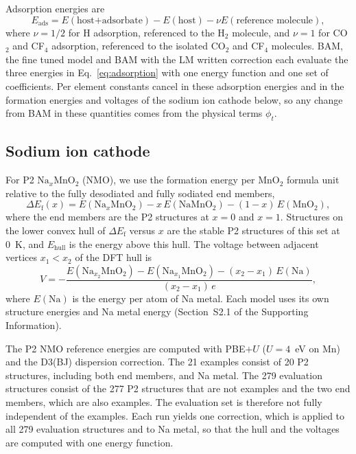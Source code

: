 Adsorption energies are
\begin{equation}
E_{\mathrm{ads}}=E(\text{host+adsorbate})-E(\text{host})-\nu E(\text{reference molecule}),
\label{eq:adsorption}
\end{equation}
where $\nu=1/2$ for H adsorption, referenced to the H$_2$ molecule, and $\nu=1$ for CO$_2$ and CF$_4$ adsorption, referenced to the isolated CO$_2$ and CF$_4$ molecules. BAM, the fine tuned model and BAM with the LM written correction each evaluate the three energies in Eq.~\eqref{eq:adsorption} with one energy function and one set of coefficients. Per element constants cancel in these adsorption energies and in the formation energies and voltages of the sodium ion cathode below, so any change from BAM in these quantities comes from the physical terms $\phi_t$.

\subsection{Sodium ion cathode}
\label{sec:hull-methods}

For P2 $\mathrm{Na}_x\mathrm{MnO_2}$ (NMO), we use the formation energy per MnO$_2$ formula unit relative to the fully desodiated and fully sodiated end members,
\begin{equation}
\Delta E_\mathrm{f}(x)=E(\mathrm{Na}_x\mathrm{MnO_2})-x\,E(\mathrm{NaMnO_2})-(1-x)\,E(\mathrm{MnO_2}),
\label{eq:emix}
\end{equation}
where the end members are the P2 structures at $x=0$ and $x=1$. Structures on the lower convex hull of $\Delta E_\mathrm{f}$ versus $x$ are the stable P2 structures of this set at 0~K, and $E_{\mathrm{hull}}$ is the energy above this hull. The voltage between adjacent vertices $x_1<x_2$ of the DFT hull is
\begin{equation}
V=-\frac{E(\mathrm{Na}_{x_2}\mathrm{MnO_2})-E(\mathrm{Na}_{x_1}\mathrm{MnO_2})-(x_2-x_1)\,E(\mathrm{Na})}{(x_2-x_1)\,e},
\label{eq:voltage}
\end{equation}
where $E(\mathrm{Na})$ is the energy per atom of Na metal. Each model uses its own structure energies and Na metal energy (Section~S2.1 of the Supporting Information).

The P2 NMO reference energies are computed with PBE$+U$ ($U=4$~eV on Mn) and the D3(BJ) dispersion correction. The 21 examples consist of 20 P2 structures, including both end members, and Na metal. The 279 evaluation structures consist of the 277 P2 structures that are not examples and the two end members, which are also examples. The evaluation set is therefore not fully independent of the examples. Each run yields one correction, which is applied to all 279 evaluation structures and to Na metal, so that the hull and the voltages are computed with one energy function.

